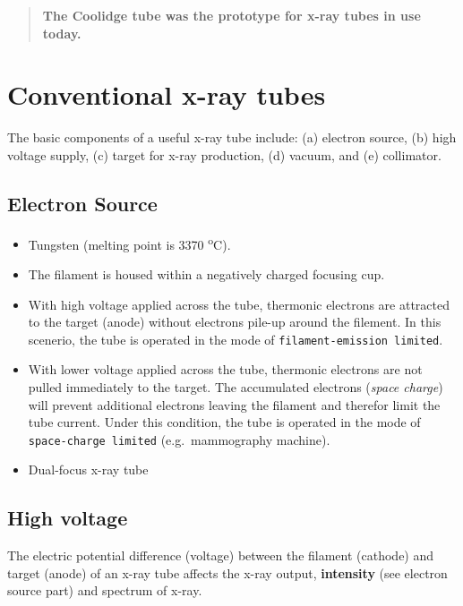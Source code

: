 \documentclass[]{book}
\providecommand{\tightlist}{%
  \setlength{\itemsep}{0pt}\setlength{\parskip}{0pt}}
\theoremstyle{definition}
\theoremstyle{definition}
\theoremstyle{definition}
\theoremstyle{remark}
\begin{document}
\begin{quote}
\textbf{The Coolidge tube was the prototype for x-ray tubes in use
today.}
\end{quote}

\section{Conventional x-ray tubes}\label{conventional-x-ray-tubes}

The basic components of a useful x-ray tube include: (a) electron
source, (b) high voltage supply, (c) target for x-ray production, (d)
vacuum, and (e) collimator.

\subsection{Electron Source}\label{electron-source}

\begin{itemize}
\tightlist
\item
  Tungsten (melting point is 3370 \textsuperscript{o}C).
\item
  The filament is housed within a negatively charged focusing cup.
\item
  With high voltage applied across the tube, thermonic electrons are
  attracted to the target (anode) without electrons pile-up around the
  filement. In this scenerio, the tube is operated in the mode of
  \texttt{filament-emission\ limited}.
\item
  With lower voltage applied across the tube, thermonic electrons are
  not pulled immediately to the target. The accumulated electrons
  (\emph{space charge}) will prevent additional electrons leaving the
  filament and therefor limit the tube current. Under this condition,
  the tube is operated in the mode of \texttt{space-charge\ limited}
  (e.g.~mammography machine).
\item
  Dual-focus x-ray tube
\end{itemize}

\subsection{High voltage}\label{high-voltage}

The electric potential difference (voltage) between the filament
(cathode) and target (anode) of an x-ray tube affects the x-ray output,
\textbf{intensity} (see electron source part) and spectrum of x-ray.
\end{document}
